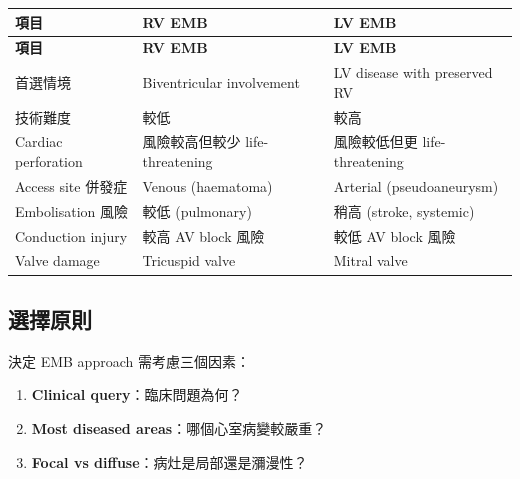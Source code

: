 \documentclass[12pt,a4paper]{article}
\begin{document}
\begin{longtable}{p{4cm}p{5cm}p{5cm}}
\toprule
\textbf{項目} & \textbf{RV EMB} & \textbf{LV EMB} \\
\midrule
\endfirsthead

\toprule
\textbf{項目} & \textbf{RV EMB} & \textbf{LV EMB} \\
\midrule
\endhead

\bottomrule
\endfoot

首選情境 & Biventricular involvement & LV disease with preserved RV \\
\midrule
技術難度 & 較低 & 較高 \\
\midrule
Cardiac perforation & 風險較高但較少 life-threatening & 風險較低但更 life-threatening \\
\midrule
Access site 併發症 & Venous (haematoma) & Arterial (pseudoaneurysm) \\
\midrule
Embolisation 風險 & 較低 (pulmonary) & 稍高 (stroke, systemic) \\
\midrule
Conduction injury & 較高 AV block 風險 & 較低 AV block 風險 \\
\midrule
Valve damage & Tricuspid valve & Mitral valve \\
\bottomrule
\end{longtable}

\subsection{選擇原則}

決定 EMB approach 需考慮三個因素：
\begin{enumerate}
    \item \textbf{Clinical query}：臨床問題為何？
    \item \textbf{Most diseased areas}：哪個心室病變較嚴重？
    \item \textbf{Focal vs diffuse}：病灶是局部還是瀰漫性？
\end{enumerate}

\end{document}
